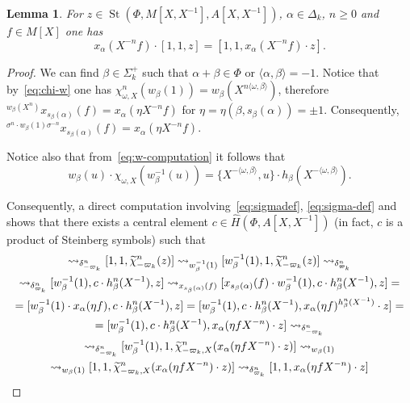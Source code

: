 \documentclass[oneside, 10pt]{amsart}
\DeclareMathOperator{\St}{St}
\newcommand{\StH}{\widehat{H}}
\newcommand{\inv}{^{-1}}
\numberwithin{equation}{section}
\numberwithin{thm}{section}
\newtheorem{lemma}[thm]{Lemma}
\numberwithin{lemma}{section}
\theoremstyle{definition}
\theoremstyle{remark}
\begin{document}
\begin{lemma} \label{lem:family2}
For $z \in \St(\Phi, M[X, X\inv], A[X, X\inv])$, $\alpha \in \Delta_k$, $n \geq 0$ and $f \in M[X]$ one has
\begin{equation*} x_\alpha(X^{-n} f) \cdot [1, 1, z] = [1, 1, x_\alpha(X^{-n} f) \cdot z]. \end{equation*}
\end{lemma}
\begin{proof}
We can find $\beta \in \Sigma_k^+$ such that $\alpha + \beta \in \Phi$ or $\langle \alpha, \beta \rangle = -1$.
Notice that by~\eqref{eq:chi-w} one has $\chi_{\omega, X}^n(w_\beta(1)) = w_\beta(X^{n\langle \omega, \beta \rangle})$, therefore
${}^{w_\beta(X^n)} x_{s_\beta(\alpha)}(f) = x_\alpha(\eta X^{-n} f)$
for $\eta = \eta(\beta, s_\beta(\alpha)) = \pm 1$.
Consequently, ${}^{\sigma^n \cdot w_\beta(1) \sigma^{-n}} x_{s_\beta(\alpha)}(f) = x_\alpha(\eta X^{-n} f)$.

Notice also that from~\eqref{eq:w-computation} it follows that
\[ w_\beta(u) \cdot \chi_{\omega, X}(w^{-1}_\beta(u)) = \{ X^{-\langle \omega, \beta \rangle }, u \} \cdot h_\beta(X^{-\langle \omega, \beta \rangle}). \]

Consequently, a direct computation involving~\eqref{eq:sigmadef}, \eqref{eq:sigma-def} and~\cite[Lemme~5.1--5.2]{Ma69}
shows that there exists a central element $c \in \StH(\Phi, A[X, X\inv])$ (in fact, $c$ is a product of Steinberg symbols) such that
\begin{multline*}
[1, 1, z] \rightsquigarrow_{\delta_{-\varpi_k}^n}
[1, 1, \widetilde{\chi}_{-\varpi_k}^n(z)] \rightsquigarrow_{w^{-1}_\beta(1)}
[w_\beta^{-1}(1), 1, \widetilde{\chi}_{-\varpi_k}^n(z)] \rightsquigarrow_{\delta_{\varpi_k}^n} \\
\rightsquigarrow_{\delta_{\varpi_k}^n} [w_\beta^{-1}(1), c \cdot h_\beta^n(X^{-1}), z] \rightsquigarrow_{x_{s_\beta(\alpha)}(f)}
[x_{s_\beta(\alpha)}(f) \cdot w_\beta^{-1}(1), c \cdot h_\beta^n(X^{-1}), z] = \\
= [w_\beta^{-1}(1) \cdot x_{\alpha}(\eta f), c \cdot h_\beta^n(X^{-1}), z] =
[w_\beta^{-1}(1), c \cdot h_\beta^n(X^{-1}), x_{\alpha}(\eta f)^{h_\beta^n(X^{-1})} \cdot z] = \\
= [w_\beta^{-1}(1), c \cdot h_\beta^n(X^{-1}), x_{\alpha}(\eta fX^{-n}) \cdot z] \rightsquigarrow_{\delta_{-\varpi_k}^n} \\
\rightsquigarrow_{\delta_{-\varpi_k}^n} [w_\beta^{-1}(1), 1, \widetilde{\chi}_{-\varpi_k, X}^n (x_{\alpha}(\eta fX^{-n}) \cdot z)] \rightsquigarrow_{ w_\beta(1) } \\
\rightsquigarrow_{ w_\beta(1) } [1, 1, \widetilde{\chi}_{-\varpi_k, X}^n (x_{\alpha}(\eta fX^{-n}) \cdot z)] \rightsquigarrow_{\delta_{\varpi_k}^n}
[1, 1, x_{\alpha}(\eta fX^{-n}) \cdot z] \qedhere
\end{multline*}
\end{proof}
\end{document}
